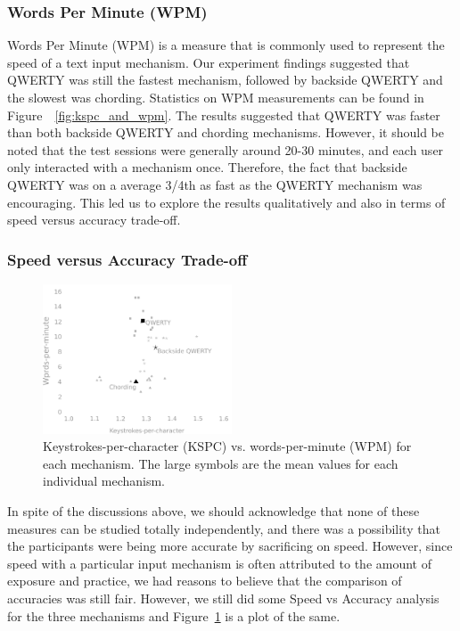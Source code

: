 \subsubsection{Words Per Minute (WPM)}

Words Per Minute (WPM) is a measure that is commonly used to represent
the speed of a text input mechanism. Our experiment findings suggested
that QWERTY was still the fastest mechanism, followed by backside
QWERTY and the slowest was chording. Statistics on WPM measurements
can be found in Figure~~\ref{fig:kspc_and_wpm}.  The results suggested
that QWERTY was faster than both backside QWERTY and chording
mechanisms. However, it should be noted that the test sessions were
generally around 20-30 minutes, and each user only interacted with a
mechanism once. Therefore, the fact that backside QWERTY was on a
average 3/4th as fast as the QWERTY mechanism was encouraging. This
led us to explore the results qualitatively and also in terms of speed
versus accuracy trade-off.

\subsubsection{Speed versus Accuracy Trade-off}

\begin{figure}
    \includegraphics[width=0.5\textwidth]{Figures/kspc_vs_wpm.pdf} 
    \caption{Keystrokes-per-character (KSPC) vs. words-per-minute
      (WPM) for each mechanism.  The large symbols are the mean values
      for each individual mechanism. }
    \label{fig:kspc_vs_wpm}
\end{figure}

In spite of the discussions above, we should acknowledge that none of
these measures can be studied totally independently, and there was a
possibility that the participants were being more accurate by
sacrificing on speed. However, since speed with a particular input
mechanism is often attributed to the amount of exposure and practice,
we had reasons to believe that the comparison of accuracies was still
fair. However, we still did some Speed vs Accuracy analysis for the
three mechanisms and Figure~\ref{fig:kspc_vs_wpm} is a plot of the
same.

